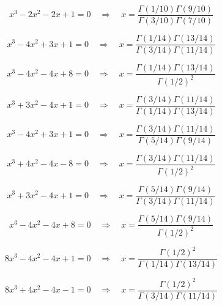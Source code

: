 \documentclass[11pt,a4paper]{article}
\begin{document}
\begin{equation}\label{eq:58}
x^{3} - 2x^{2} - 2x + 1 = 0 \quad \Rightarrow \quad x = \frac{\Gamma(1/10)\Gamma(9/10)}{\Gamma(3/10)\Gamma(7/10)}
\end{equation}

\begin{equation}\label{eq:59}
x^{3} - 4x^{2} + 3x + 1 = 0 \quad \Rightarrow \quad x = \frac{\Gamma(1/14)\Gamma(13/14)}{\Gamma(3/14)\Gamma(11/14)}
\end{equation}

\begin{equation}\label{eq:60}
x^{3} - 4x^{2} - 4x + 8 = 0 \quad \Rightarrow \quad x = \frac{\Gamma(1/14)\Gamma(13/14)}{\Gamma(1/2)^2}
\end{equation}

\begin{equation}\label{eq:61}
x^{3} + 3x^{2} - 4x + 1 = 0 \quad \Rightarrow \quad x = \frac{\Gamma(3/14)\Gamma(11/14)}{\Gamma(1/14)\Gamma(13/14)}
\end{equation}

\begin{equation}\label{eq:62}
x^{3} - 4x^{2} + 3x + 1 = 0 \quad \Rightarrow \quad x = \frac{\Gamma(3/14)\Gamma(11/14)}{\Gamma(5/14)\Gamma(9/14)}
\end{equation}

\begin{equation}\label{eq:63}
x^{3} + 4x^{2} - 4x - 8 = 0 \quad \Rightarrow \quad x = \frac{\Gamma(3/14)\Gamma(11/14)}{\Gamma(1/2)^2}
\end{equation}

\begin{equation}\label{eq:64}
x^{3} + 3x^{2} - 4x + 1 = 0 \quad \Rightarrow \quad x = \frac{\Gamma(5/14)\Gamma(9/14)}{\Gamma(3/14)\Gamma(11/14)}
\end{equation}

\begin{equation}\label{eq:65}
x^{3} - 4x^{2} - 4x + 8 = 0 \quad \Rightarrow \quad x = \frac{\Gamma(5/14)\Gamma(9/14)}{\Gamma(1/2)^2}
\end{equation}

\begin{equation}\label{eq:66}
8x^{3} - 4x^{2} - 4x + 1 = 0 \quad \Rightarrow \quad x = \frac{\Gamma(1/2)^2}{\Gamma(1/14)\Gamma(13/14)}
\end{equation}

\begin{equation}\label{eq:67}
8x^{3} + 4x^{2} - 4x - 1 = 0 \quad \Rightarrow \quad x = \frac{\Gamma(1/2)^2}{\Gamma(3/14)\Gamma(11/14)}
\end{equation}
\end{document}
